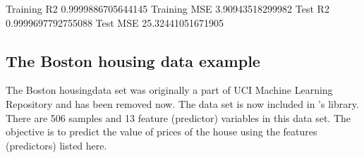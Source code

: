 \documentclass[letterpaper,10pt,english]{sphinxmanual}
\begin{document}
\begin{sphinxVerbatim}[commandchars=\\\{\}]
    
    
\end{sphinxVerbatim}

\begin{sphinxVerbatim}[commandchars=\\\{\}]
Training R2
0.9999886705644145
Training MSE
3.90943518299982
Test R2
0.9999697792755088
Test MSE
25.32441051671905
\end{sphinxVerbatim}




\subsection{The Boston housing data example}
\label{\detokenize{chapter4:the-boston-housing-data-example}}
The Boston housingdata set was originally a part of UCI Machine Learning Repository
and has been removed now. The data set is now included in ’s
library.  There are 506 samples and 13 feature (predictor) variables
in this data set. The objective is to predict the value of prices of
the house using the features (predictors) listed here.
\end{document}
